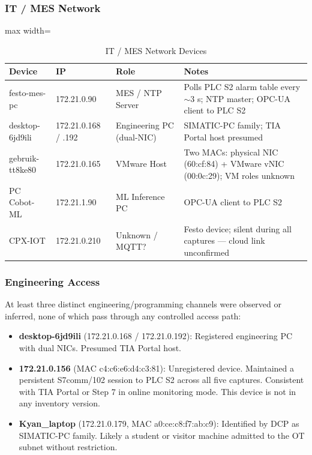 \subsubsection{IT / MES Network}

\begin{table}[H]
\centering
\begin{adjustbox}{max width=\textwidth}
\begin{tabular}{@{}llll@{}}
\toprule
\textbf{Device} & \textbf{IP} & \textbf{Role} & \textbf{Notes} \\
\midrule
festo-mes-pc & 172.21.0.90 & MES / NTP Server & Polls PLC S2 alarm table every $\sim$3 s; NTP master; OPC-UA client to PLC S2 \\
desktop-6jd9ili & 172.21.0.168 / .192 & Engineering PC (dual-NIC) & SIMATIC-PC family; TIA Portal host presumed \\
gebruik-tt8ke80 & 172.21.0.165 & VMware Host & Two MACs: physical NIC (60:cf:84) + VMware vNIC (00:0c:29); VM roles unknown \\
PC Cobot-ML & 172.21.1.90 & ML Inference PC & OPC-UA client to PLC S2 \\
CPX-IOT & 172.21.0.210 & Unknown / MQTT? & Festo device; silent during all captures — cloud link unconfirmed \\
\bottomrule
\end{tabular}
\end{adjustbox}
\caption{IT / MES Network Devices}
\end{table}

\subsubsection{Engineering Access}

At least three distinct engineering/programming channels were observed or inferred, none of which pass through any controlled access path:

\begin{itemize}
\item \textbf{desktop-6jd9ili} (172.21.0.168 / 172.21.0.192): Registered engineering PC with dual NICs. Presumed TIA Portal host.
\item \textbf{172.21.0.156} (MAC c4:c6:e6:d4:c3:81): Unregistered device. Maintained a persistent S7comm/102 session to PLC S2 across all five captures. Consistent with TIA Portal or Step 7 in online monitoring mode. This device is not in any inventory version.
\item \textbf{Kyan\_laptop} (172.21.0.179, MAC a0:ce:c8:f7:ab:c9): Identified by DCP as SIMATIC-PC family. Likely a student or visitor machine admitted to the OT subnet without restriction.
\end{itemize}

